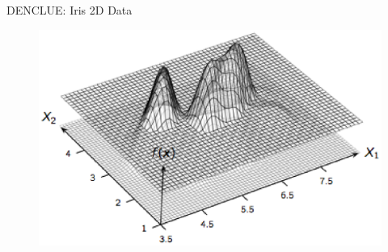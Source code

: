 \begin{frame}{DENCLUE: Iris 2D Data}
\begin{figure}
\centering
\includegraphics[scale=0.6]{CLUST/density/figs/draftfigs/irisSlice.eps}
\end{figure}
\end{frame}


